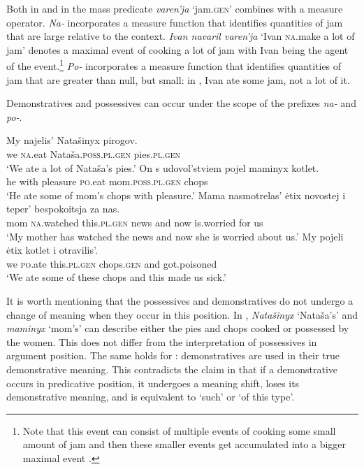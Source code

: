 \documentclass[output=paper]{langscibook}
\begin{document}
\noindent Both in  and in  the mass predicate \textit{varen'ja} `jam.\textsc{gen}' combines with a measure operator. \textit{Na-} incorporates a measure function that identifies quantities of jam that are large relative to the context. \textit{Ivan navaril varen'ja} `Ivan \textsc{na}.make a lot of jam' denotes a maximal event of cooking a lot of jam with Ivan being the agent of the event.\footnote{Note that this event can consist of multiple events of cooking some small amount of jam and then these smaller events get accumulated into a bigger maximal event \citep{Filip.Rothstein2006}.} \textit{Po-} incorporates a measure function that identifies quantities of jam that are greater than null, but small: in , Ivan ate some jam, not a lot of it.

Demonstratives and possessives can occur under the scope of the prefixes \textit{na-} and \textit{po-}. 


\ea\label{pirogi_kotlet}
    \ea \gll My najelis' Natašinyx pirogov.\\
    we {\textsc{na}.eat} Nataša.\textsc{poss.pl.gen} pies.\textsc{pl.gen}\\     %
    \glt `We ate a lot of Nataša's pies.'
    \ex \gll On s udovol'stviem pojel maminyx kotlet.\\
    he with pleasure {\textsc{po}.eat} mom.\textsc{poss.pl.gen} chops\\
    \glt `He ate some of mom's chops with pleasure.'
\z\ex\label{novosti} 
    \ea \gll Mama nasmotrelas' ėtix novostej i teper' bespokoitsja za nas.\\
    mom {\textsc{na}.watched} this.\textsc{pl.gen} news and now is.worried for us\\
    \glt `My mother has watched the news and now she is worried about us.'
    \ex \gll My pojeli ėtix kotlet i otravilis'.\\
    we {\textsc{po}.ate} this.\textsc{pl.gen} chops.\textsc{gen} and got.poisoned\\
    \glt `We ate some of these chops and this made us sick.'
\z\z

\noindent It is worth mentioning that the possessives and demonstratives do not undergo a change of meaning when they occur in this position. In , \textit{Natašinyx} `Nataša's' and \textit{maminyx} `mom's' can describe either the pies and chops cooked or possessed by the women. This does not differ from the interpretation of possessives in argument position. The same holds for :  demonstratives are used in their true demonstrative meaning. This contradicts the claim in \citet{Kagan.Pereltsvaig2014} that if a demonstrative occurs in predicative position, it undergoes a meaning shift, loses its demonstrative meaning, and is equivalent to `such' or `of this type'. 
\end{document}
